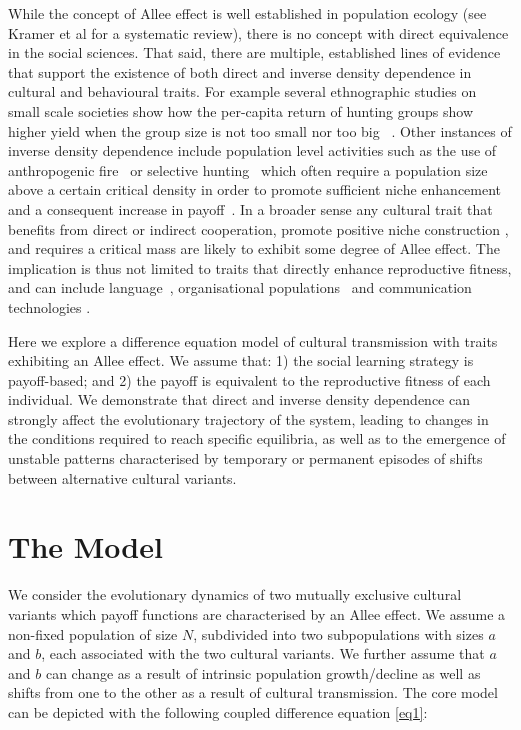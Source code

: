 \documentclass[review,authoryear]{elsarticle}
\begin{document}
While the concept of Allee effect is well established in population ecology (see Kramer et al \citeyear{kramer_etal_2009} for a systematic review), there is no concept with direct equivalence in the social sciences. That said, there are multiple, established lines of evidence that support  the existence of both direct and inverse density dependence in cultural and behavioural traits. For example several ethnographic studies on small scale societies show how the per-capita return of hunting groups show higher yield when the group size is not too small nor too big~ \citep{hill_and_hawkes_1983,janssen_and_hill_2014}. Other instances of inverse density dependence include population level activities such as the use of anthropogenic fire~\citep{bird2013} or selective hunting~\citep{dods_2002} which often require a population size above a certain critical density in order to promote sufficient niche enhancement and a consequent increase in payoff~\citep{rowley-conwy_and_layton_2011}. In a broader sense any cultural trait that benefits from direct or indirect cooperation, 
promote positive niche construction \citep{vandermeer_2008}, and requires a critical mass \citep{rogers_2003} are likely to exhibit some degree of Allee effect. The implication is thus not limited to traits that directly enhance reproductive fitness, and can include language~\citep{kandler2009}, organisational populations~\citep{caroll_and_hannan_1989} and communication technologies \citep{van_slyke_perceived_2007}.

Here we explore a difference equation model of cultural transmission with traits exhibiting an Allee effect.  We assume that: 1) the social learning strategy is payoff-based; and 2)  the payoff is equivalent to the reproductive fitness of each individual. We demonstrate that direct and inverse density dependence can strongly affect the evolutionary trajectory of the system, leading to changes in the conditions required to reach specific equilibria, as well as to the emergence of unstable patterns characterised by temporary or permanent episodes of shifts between alternative cultural variants.

\section{The Model}
We consider the evolutionary dynamics of two mutually exclusive cultural variants which payoff functions are characterised by an Allee effect. We assume a non-fixed population of size $N$, subdivided into two subpopulations with sizes $a$ and $b$, each associated with the two cultural variants. We further assume that $a$ and $b$ can change as a result of intrinsic population growth/decline as well as shifts from one to the other as a result of cultural transmission. The core model can be depicted with the following coupled difference equation \eqref{eq1}:
\end{document}
